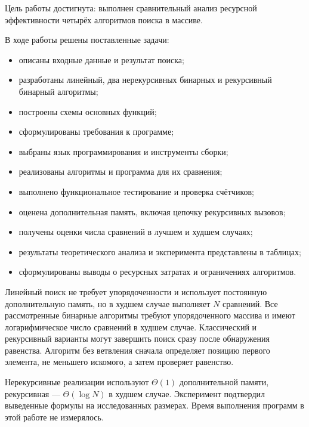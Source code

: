 Цель работы достигнута: выполнен сравнительный анализ ресурсной эффективности четырёх алгоритмов поиска в массиве.

В ходе работы решены поставленные задачи:
\begin{itemize}
\item описаны входные данные и результат поиска;
\item разработаны линейный, два нерекурсивных бинарных и рекурсивный бинарный алгоритмы;
\item построены схемы основных функций;
\item сформулированы требования к программе;
\item выбраны язык программирования и инструменты сборки;
\item реализованы алгоритмы и программа для их сравнения;
\item выполнено функциональное тестирование и проверка счётчиков;
\item оценена дополнительная память, включая цепочку рекурсивных вызовов;
\item получены оценки числа сравнений в лучшем и худшем случаях;
\item результаты теоретического анализа и эксперимента представлены в таблицах;
\item сформулированы выводы о ресурсных затратах и ограничениях алгоритмов.
\end{itemize}

Линейный поиск не требует упорядоченности и использует постоянную дополнительную память, но в худшем случае выполняет $N$ сравнений. Все рассмотренные бинарные алгоритмы требуют упорядоченного массива и имеют логарифмическое число сравнений в худшем случае. Классический и рекурсивный варианты могут завершить поиск сразу после обнаружения равенства. Алгоритм без ветвления сначала определяет позицию первого элемента, не меньшего искомого, а затем проверяет равенство.

Нерекурсивные реализации используют $\Theta(1)$ дополнительной памяти, рекурсивная --- $\Theta(\log N)$ в худшем случае. Эксперимент подтвердил выведенные формулы на исследованных размерах. Время выполнения программ в этой работе не измерялось.

